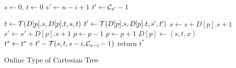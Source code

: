 \begin{algorithm}[!thb]
\SetAlgoNoLine
{}

$s \gets 0$, $t \gets 0$ \;
$s' \gets n - i + 1$ \;
$t' \gets {\cal C}_{s'} - 1$ \;

 {
  $t \gets {\cal T}(D[p].s, D[p].t, s, t)$ \;
  $t' \gets {\cal T}(D[p].s, D[p].t, s', t')$ \;
  $s \gets s + D[p].s+1$ \;
  $s' \gets s' + D[p].s+1$ \;
  $p \gets p - 1$ \;
}
$p \gets p + 1$ \;
$D[p] \gets \left \langle s, t, x \right \rangle$ \;
$t^* \gets t^* + t' - {\cal T}(s, t, s - i, {\cal C}_{s-i} - 1)$ \;
return $t^*$ \;

  \caption{Online Type of Cartesian Tree}
  \label{alg:cartesian-encode-online}
\end{algorithm}
